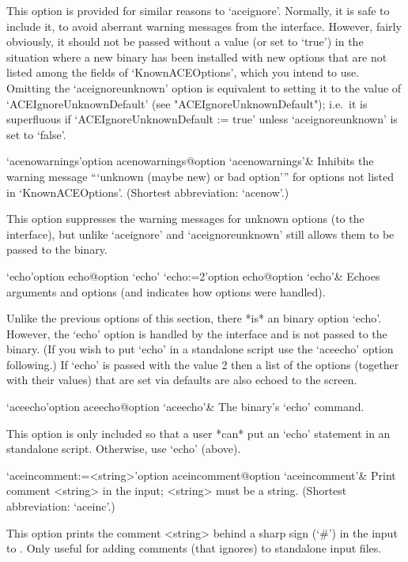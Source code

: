 This option is provided for similar reasons to `aceignore'.  Normally,
it is safe to include it, to avoid aberrant warning messages from  the
{\ACE} interface. However, fairly obviously, it should not  be  passed
without a value (or set to `true') in the situation where a new {\ACE}
binary has been installed with new options that are not  listed  among
the fields of `KnownACEOptions', which you intend to use. Omitting the
`aceignoreunknown' option is equivalent to setting it to the value  of
`ACEIgnoreUnknownDefault' (see "ACEIgnoreUnknownDefault"); i.e.~it  is
superfluous    if    `ACEIgnoreUnknownDefault    :=    true'    unless
`aceignoreunknown' is set to `false'.

\>`acenowarnings'{option acenowarnings}@{option `acenowarnings'}& 
Inhibits the warning message ```unknown (maybe new) or bad option'''
for options not listed in `KnownACEOptions'.
(Shortest abbreviation: `acenow'.)

This option suppresses the warning messages for  unknown  options  (to
the {\ACE} interface), but unlike `aceignore'  and  `aceignoreunknown'
still allows them to be passed to the {\ACE} binary.

\>`echo'{option echo}@{option `echo'} 
\>`echo:=2'{option echo}@{option `echo'}& 
Echoes arguments and options (and indicates how options were handled).

Unlike the previous options of this  section,  there  *is*  an  {\ACE}
binary option `echo'. However, the `echo' option  is  handled  by  the
{\ACE} interface and is not passed to the {\ACE} binary. (If you  wish
to put  `echo'  in  a  standalone  script  use  the  `aceecho'  option
following.) If `echo' is passed with the value 2 then a  list  of  the
options (together with their values) that are set via {\ACE}  defaults
are also echoed to the screen.

\>`aceecho'{option aceecho}@{option `aceecho'}& 
The {\ACE} binary's `echo' command.

This option is only included so  that  a  user  *can*  put  an  `echo'
statement in  an  {\ACE}  standalone  script.  Otherwise,  use  `echo'
(above).

\>`aceincomment:=<string>'{option aceincomment}@{option `aceincomment'}&
Print comment <string> in the {\ACE} input; <string> must be a string.
(Shortest abbreviation: `aceinc'.)

This option prints the comment <string> behind a sharp sign (`\#')  in
the input to {\ACE}. Only useful  for  adding  comments  (that  {\ACE}
ignores) to standalone input files.

